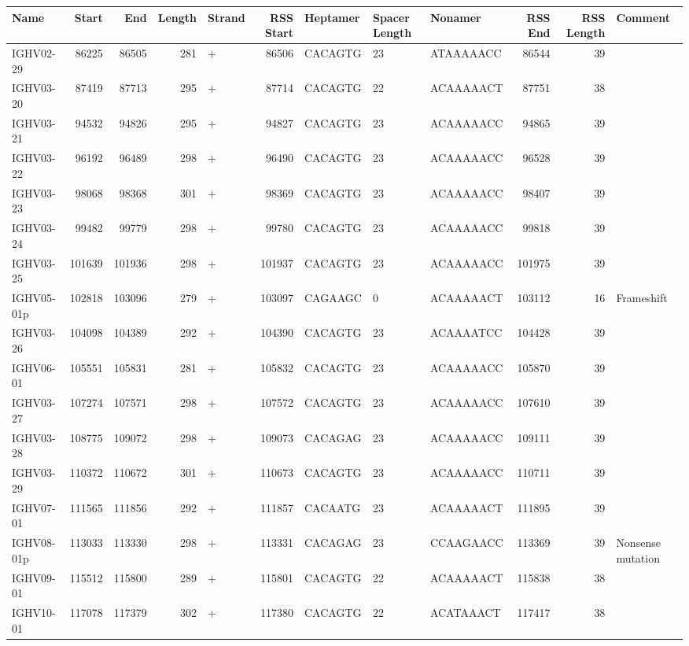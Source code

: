 \begin{tabular}{lrrrlrlllrrl}
  \toprule Name & Start & End & Length & Strand & RSS Start & Heptamer & Spacer Length & Nonamer & RSS End & RSS Length & Comment \\ 
  \midrule IGHV02-29 & 86225 & 86505 & 281 & + & 86506 & CACAGTG & 23 & ATAAAAACC & 86544 & 39 &  \\ 
  IGHV03-20 & 87419 & 87713 & 295 & + & 87714 & CACAGTG & 22 & ACAAAAACT & 87751 & 38 &  \\ 
  IGHV03-21 & 94532 & 94826 & 295 & + & 94827 & CACAGTG & 23 & ACAAAAACC & 94865 & 39 &  \\ 
  IGHV03-22 & 96192 & 96489 & 298 & + & 96490 & CACAGTG & 23 & ACAAAAACC & 96528 & 39 &  \\ 
  IGHV03-23 & 98068 & 98368 & 301 & + & 98369 & CACAGTG & 23 & ACAAAAACC & 98407 & 39 &  \\ 
  IGHV03-24 & 99482 & 99779 & 298 & + & 99780 & CACAGTG & 23 & ACAAAAACC & 99818 & 39 &  \\ 
  IGHV03-25 & 101639 & 101936 & 298 & + & 101937 & CACAGTG & 23 & ACAAAAACC & 101975 & 39 &  \\ 
  IGHV05-01p & 102818 & 103096 & 279 & + & 103097 & CAGAAGC & 0 & ACAAAAACT & 103112 & 16 & Frameshift \\ 
  IGHV03-26 & 104098 & 104389 & 292 & + & 104390 & CACAGTG & 23 & ACAAAATCC & 104428 & 39 &  \\ 
  IGHV06-01 & 105551 & 105831 & 281 & + & 105832 & CACAGTG & 23 & ACAAAAACC & 105870 & 39 &  \\ 
  IGHV03-27 & 107274 & 107571 & 298 & + & 107572 & CACAGTG & 23 & ACAAAAACC & 107610 & 39 &  \\ 
  IGHV03-28 & 108775 & 109072 & 298 & + & 109073 & CACAGAG & 23 & ACAAAAACC & 109111 & 39 &  \\ 
  IGHV03-29 & 110372 & 110672 & 301 & + & 110673 & CACAGTG & 23 & ACAAAAACC & 110711 & 39 &  \\ 
  IGHV07-01 & 111565 & 111856 & 292 & + & 111857 & CACAATG & 23 & ACAAAAACT & 111895 & 39 &  \\ 
  IGHV08-01p & 113033 & 113330 & 298 & + & 113331 & CACAGAG & 23 & CCAAGAACC & 113369 & 39 & Nonsense mutation \\ 
  IGHV09-01 & 115512 & 115800 & 289 & + & 115801 & CACAGTG & 22 & ACAAAAACT & 115838 & 38 &  \\ 
  IGHV10-01 & 117078 & 117379 & 302 & + & 117380 & CACAGTG & 22 & ACATAAACT & 117417 & 38 &  \\ 

\end{tabular}
